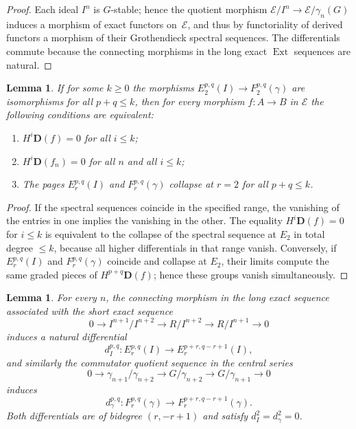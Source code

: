\documentclass[12pt]{article}
\newcommand{\E}{\mathcal{E}}
\newcommand{\Ext}{\operatorname{Ext}}
\theoremstyle{plain}
\newtheorem{lemma}[theorem]{Lemma}
\theoremstyle{definition}
\theoremstyle{remark}
\numberwithin{equation}{section}
\begin{document}
\begin{proof}
Each ideal \(I^n\) is \(G\)-stable; hence the quotient morphism
\(\E/I^n\to \E/\gamma_n(G)\) induces a morphism of exact functors on~\(\E\),
and thus by functoriality of derived functors a morphism of their Grothendieck spectral sequences. The differentials commute because the connecting morphisms in the long exact \(\Ext\) sequences are natural. 
\end{proof}

\begin{lemma}
If for some \(k\ge0\) the morphisms \(E^{p,q}_2(I)\to F^{p,q}_2(\gamma)\) are isomorphisms for all \(p+q\le k\), then for every morphism \(f:A\to B\) in \(\E\) the following conditions are equivalent:
\begin{enumerate}[label=(\alph*)]
\item \(H^i\mathbf D(f)=0\) for all \(i\le k\);
\item \(H^i\mathbf D(f_n)=0\) for all \(n\) and all \(i\le k\);
\item The pages \(E^{p,q}_r(I)\) and \(F^{p,q}_r(\gamma)\) collapse at \(r=2\) for all \(p+q\le k\).
\end{enumerate}
\end{lemma}

\begin{proof}
If the spectral sequences coincide in the specified range, the vanishing of the entries in one implies the vanishing in the other. The equality \(H^i\mathbf D(f)=0\) for \(i\le k\) is equivalent to the collapse of the spectral sequence at \(E_2\) in total degree \(\le k\), because all higher differentials in that range vanish. Conversely, if \(E^{p,q}_r(I)\) and \(F^{p,q}_r(\gamma)\) coincide and collapse at \(E_2\), their limits compute the same graded pieces of \(H^{p+q}\mathbf D(f)\); hence these groups vanish simultaneously.  
\end{proof}

\begin{lemma}
For every \(n\), the connecting morphism in the long exact sequence associated with the short exact sequence
\[
0\longrightarrow I^{n+1}/I^{n+2}\longrightarrow R/I^{n+2}\longrightarrow R/I^{n+1}\longrightarrow0
\]
induces a natural differential
\[
d_I^{p,q}:E^{p,q}_r(I)\longrightarrow E^{p+r,q-r+1}_r(I),
\]
and similarly the commutator quotient sequence in the central series
\[
0\longrightarrow \gamma_{n+1}/\gamma_{n+2}\longrightarrow G/\gamma_{n+2}\longrightarrow G/\gamma_{n+1}\longrightarrow0
\]
induces
\[
d_\gamma^{p,q}:F^{p,q}_r(\gamma)\longrightarrow F^{p+r,q-r+1}_r(\gamma).
\]
Both differentials are of bidegree \((r,-r+1)\) and satisfy \(d_I^2=d_\gamma^2=0\).
\end{lemma}
\end{document}
